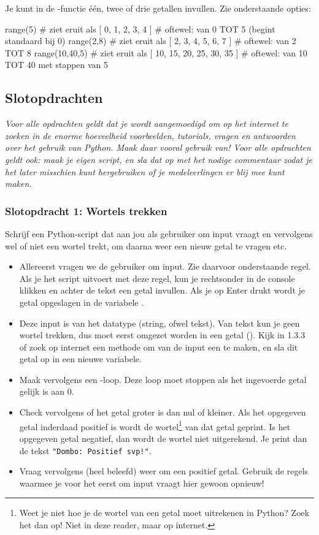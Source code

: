 \documentclass[a4paper,11pt, fleqn]{article}
\begin{document}
Je kunt in de -functie \'e\'en, twee of drie getallen invullen. Zie onderstaande opties:
\begin{python}
range(5)        # ziet eruit als [ 0, 1, 2, 3, 4 ] 
                # oftewel: van 0 TOT 5 (begint standaard bij 0)
range(2,8)      # ziet eruit als [ 2, 3, 4, 5, 6, 7 ] 
                # oftewel: van 2 TOT 8
range(10,40,5)  # ziet eruit als [ 10, 15, 20, 25, 30, 35 ]
                # oftewel: van 10 TOT 40 met stappen van 5
\end{python}

\subsection{Slotopdrachten}
{\it Voor alle opdrachten geldt dat je wordt aangemoedigd om op het internet te zoeken in de enorme hoeveelheid voorbeelden, tutorials, vragen en antwoorden over het gebruik van Python. Maak daar vooral gebruik van! Voor alle opdrachten geldt ook: maak je eigen script, en sla dat op met het nodige commentaar zodat je het later misschien kunt hergebruiken of je medeleerlingen er blij mee kunt maken.}

\subsubsection{Slotopdracht 1: Wortels trekken} 

Schrijf een Python-script dat aan jou als gebruiker om input vraagt en vervolgens wel of niet een wortel trekt, om daarna weer een nieuw getal te vragen etc.

\begin{itemize}
	\item Allereerst vragen we de gebruiker om input. Zie daarvoor onderstaande regel. Als je het script uitvoert met deze regel, kun je rechtsonder in de console klikken en achter de tekst een getal invullen. Als je op Enter drukt wordt je getal opgeslagen in de variabele .
	\item Deze input is van het datatype  (string, ofwel tekst). Van tekst kun je geen wortel trekken, dus moet  eerst omgezet worden in een getal (). Kijk in 1.3.3 of zoek op internet een methode om van de input een  te maken, en sla dit getal op in een nieuwe variabele.
	\item Maak vervolgens een -loop. Deze loop moet stoppen als het ingevoerde getal gelijk is aan 0.
	\item Check vervolgens of het getal groter is dan nul of kleiner. Als het opgegeven getal inderdaad positief is wordt de wortel\footnote{Weet je niet hoe je de wortel van een getal moet uitrekenen in Python? Zoek het dan op! Niet in deze reader, maar op internet.} van dat getal geprint. Is het opgegeven getal negatief, dan wordt de wortel niet uitgerekend. Je print dan de tekst \verb."Dombo: Positief svp!"..
	\item Vraag vervolgens (heel beleefd) weer om een positief getal. Gebruik de regels waarmee je voor het eerst om input vraagt hier gewoon opnieuw!
\end{itemize}
\end{document}
